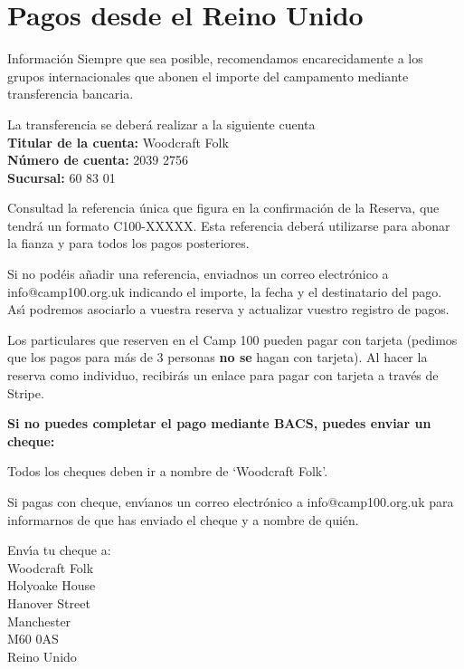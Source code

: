\documentclass[a4paper, 11pt]{report}
\begin{document}
\makedocumenttitlepage

\tableofcontents

\chapter{Pagos desde el Reino Unido}

\begin{callout-green}{Informaci\'on}
Siempre que sea posible, recomendamos encarecidamente a los grupos internacionales que abonen el importe del campamento mediante transferencia bancaria. 
\end{callout-green}

La transferencia se deber\'a realizar a la siguiente cuenta\\
\textbf{Titular de la cuenta:} Woodcraft Folk\\
\textbf{Número de cuenta:} 2039 2756\\
\textbf{Sucursal:} 60 83 01

Consultad la referencia única que figura en la confirmaci\'on de la Reserva, que tendr\'a un formato C100-XXXXX. Esta referencia deber\'a utilizarse para abonar la fianza y para todos los pagos posteriores. 

Si no pod\'eis a\~nadir una referencia, enviadnos un correo electr\'onico a info@camp100.org.uk indicando el importe, la fecha y el destinatario del pago. As\'{\i} podremos asociarlo a vuestra reserva y actualizar vuestro registro de pagos.

Los particulares que reserven en el Camp 100 pueden pagar con tarjeta (pedimos que los pagos para m\'as de 3 personas \textbf{no se} hagan con tarjeta). Al hacer la reserva como individuo, recibir\'as un enlace para pagar con tarjeta a trav\'es de Stripe.

\textbf{Si no puedes completar el pago mediante BACS, puedes enviar un cheque:}

Todos los cheques deben ir a nombre de `Woodcraft Folk'.

Si pagas con cheque, env\'{\i}anos un correo electr\'onico a info@camp100.org.uk para informarnos de que has enviado el cheque y a nombre de qui\'en. 

Env\'{\i}a tu cheque a:\\
Woodcraft Folk\\
Holyoake House\\
Hanover Street\\
Manchester \\
M60 0AS\\
Reino Unido
\end{document}
